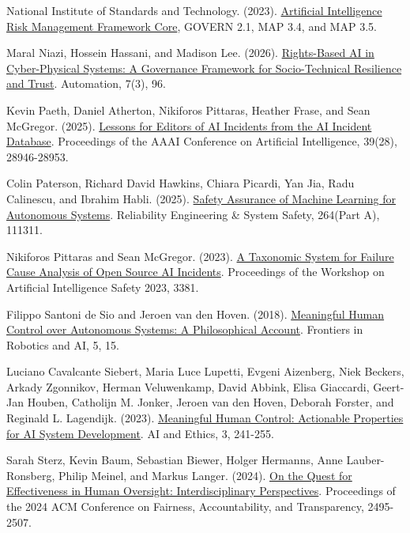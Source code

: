 \documentclass[11pt]{article}
\newenvironment{TAEReferences}{%
  \begin{list}{}{%
    \renewcommand{\makelabel}[1]{}%
    \setlength{\labelwidth}{0pt}%
    \setlength{\labelsep}{0pt}%
    \setlength{\leftmargin}{0.5in}%
    \setlength{\itemindent}{-0.5in}%
    \setlength{\itemsep}{0.45em}%
    \setlength{\parsep}{0pt}%
    \setlength{\topsep}{0.25em}%
  }%
}{\end{list}}
\begin{document}
\begin{TAEReferences}
\item{}\label{reference-34} National Institute of Standards and Technology. (2023). \href{https://airc.nist.gov/airmf-resources/airmf/5-sec-core/}{Artificial Intelligence Risk Management Framework Core}, GOVERN 2.1, MAP 3.4, and MAP 3.5.
\item{}\label{reference-35} Maral Niazi, Hossein Hassani, and Madison Lee. (2026). \href{https://doi.org/10.3390/automation7030096}{Rights-Based AI in Cyber-Physical Systems: A Governance Framework for Socio-Technical Resilience and Trust}. Automation, 7(3), 96.
\item{}\label{reference-36} Kevin Paeth, Daniel Atherton, Nikiforos Pittaras, Heather Frase, and Sean McGregor. (2025). \href{https://doi.org/10.1609/aaai.v39i28.35163}{Lessons for Editors of AI Incidents from the AI Incident Database}. Proceedings of the AAAI Conference on Artificial Intelligence, 39(28), 28946-28953.
\item{}\label{reference-37} Colin Paterson, Richard David Hawkins, Chiara Picardi, Yan Jia, Radu Calinescu, and Ibrahim Habli. (2025). \href{https://doi.org/10.1016/j.ress.2025.111311}{Safety Assurance of Machine Learning for Autonomous Systems}. Reliability Engineering \& System Safety, 264(Part A), 111311.
\item{}\label{reference-38} Nikiforos Pittaras and Sean McGregor. (2023). \href{https://ceur-ws.org/Vol-3381/17.pdf}{A Taxonomic System for Failure Cause Analysis of Open Source AI Incidents}. Proceedings of the Workshop on Artificial Intelligence Safety 2023, 3381.
\item{}\label{reference-39} Filippo Santoni de Sio and Jeroen van den Hoven. (2018). \href{https://doi.org/10.3389/frobt.2018.00015}{Meaningful Human Control over Autonomous Systems: A Philosophical Account}. Frontiers in Robotics and AI, 5, 15.
\item{}\label{reference-40} Luciano Cavalcante Siebert, Maria Luce Lupetti, Evgeni Aizenberg, Niek Beckers, Arkady Zgonnikov, Herman Veluwenkamp, David Abbink, Elisa Giaccardi, Geert-Jan Houben, Catholijn M. Jonker, Jeroen van den Hoven, Deborah Forster, and Reginald L. Lagendijk. (2023). \href{https://doi.org/10.1007/s43681-022-00167-3}{Meaningful Human Control: Actionable Properties for AI System Development}. AI and Ethics, 3, 241-255.
\item{}\label{reference-41} Sarah Sterz, Kevin Baum, Sebastian Biewer, Holger Hermanns, Anne Lauber-Ronsberg, Philip Meinel, and Markus Langer. (2024). \href{https://doi.org/10.1145/3630106.3659051}{On the Quest for Effectiveness in Human Oversight: Interdisciplinary Perspectives}. Proceedings of the 2024 ACM Conference on Fairness, Accountability, and Transparency, 2495-2507.

\end{TAEReferences}
\end{document}
